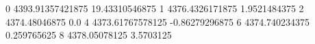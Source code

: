 0 4393.91357421875 19.43310546875
1 4376.4326171875 1.9521484375
2 4374.48046875 0.0
4 4373.61767578125 -0.86279296875
6 4374.740234375 0.259765625
8 4378.05078125 3.5703125
